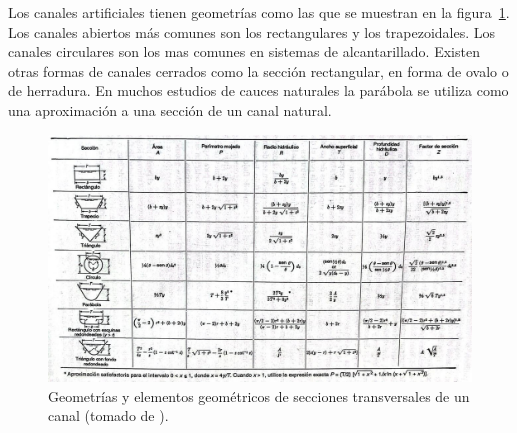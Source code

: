 \documentclass[11pt, oneside]{article}
\begin{document}
Los canales artificiales tienen geometr\'ias como las que se muestran en la figura~\ref{fig3}. Los canales abiertos m\'as comunes son los rectangulares y los trapezoidales. Los canales circulares son los mas comunes en sistemas de alcantarillado. Existen otras formas de canales cerrados como la secci\'on rectangular, en forma de ovalo o de herradura. En muchos estudios de cauces naturales la par\'abola se utiliza como una aproximaci\'on a una secci\'on de un canal natural. 

\begin{figure}[h]
\centering
\includegraphics[width=\textwidth]{fig3.jpeg}
\caption{Geometr\'ias y elementos geom\'etricos de secciones transversales de un canal (tomado de \cite{VChow}).}
\label{fig3}
\end{figure}
\end{document}
